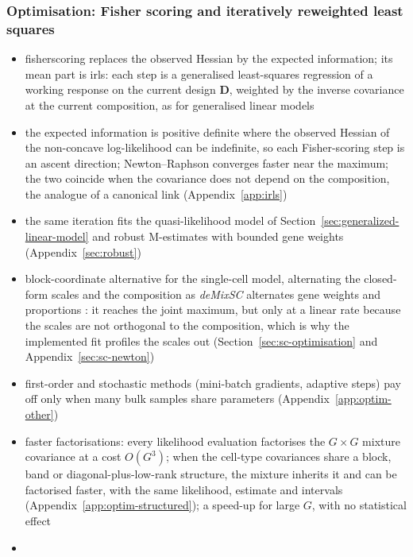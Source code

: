 \documentclass[pdflatex, sn-nature]{sn-jnl}
\theoremstyle{thmstyleone}%
\theoremstyle{thmstyletwo}%
\theoremstyle{thmstylethree}%
\begin{document}
\subsubsection{Optimisation: Fisher scoring and iteratively reweighted least squares}
\label{sec:optim-perspective}

\begin{itemize}
  \item \gls{fisherscoring} replaces the observed Hessian by the expected information; its mean part is
        \gls{irls}: each step is a generalised least-squares regression of a working response on the current
        design \(\boldsymbol{D}\), weighted by the inverse covariance at the current composition, as for generalised linear
        models \cite[Sect.~4.5.4]{agrestiFoundationsLinearGeneralized2015} \cite{nelderGeneralizedLinearModels1972}
  \item the expected information is positive definite where the observed Hessian of the non-concave
        log-likelihood can be indefinite, so each Fisher-scoring step is an ascent direction; Newton--Raphson
        converges faster near the maximum; the two coincide when the covariance does not depend on the
        composition, the analogue of a canonical link (Appendix~\ref{app:irls})
  \item the same iteration fits the quasi-likelihood model of Section~\ref{sec:generalized-linear-model} and
        robust M-estimates with bounded gene weights (Appendix~\ref{sec:robust})
  \item block-coordinate alternative for the single-cell model, alternating the closed-form scales and the composition
        as \emph{deMixSC} alternates gene weights and proportions \cite{guoDeMixSCDeconvolutionFramework2023}: it reaches
        the joint maximum, but only at a linear rate because the scales are not orthogonal to the composition, which is why
        the implemented fit profiles the scales out (Section~\ref{sec:sc-optimisation} and Appendix~\ref{sec:sc-newton})
  \item first-order and stochastic methods (mini-batch gradients, adaptive steps) pay off only when many bulk
        samples share parameters (Appendix~\ref{app:optim-other})
  \item faster factorisations: every likelihood evaluation factorises the \(G\times G\) mixture covariance at a cost
        \(O(G^{3})\); when the cell-type covariances share a block, band or diagonal-plus-low-rank structure, the mixture
        inherits it and can be factorised faster, with the same likelihood, estimate and intervals
        (Appendix~\ref{app:optim-structured}); a speed-up for large \(G\), with no statistical effect
  \item[] 
\end{itemize}
\end{document}
